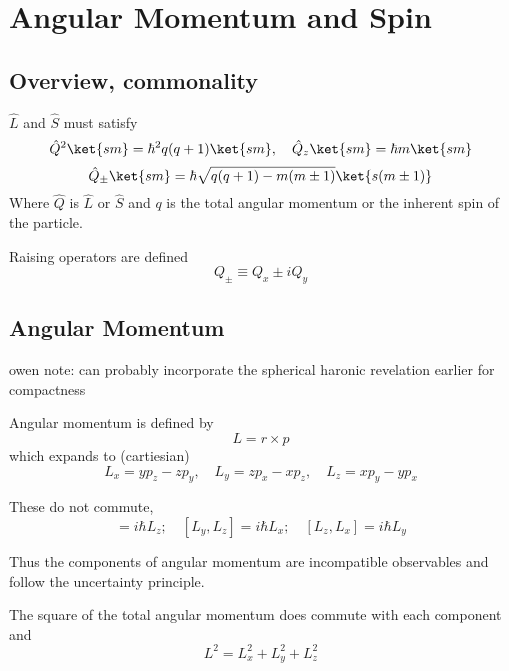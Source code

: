 \section{Angular Momentum and Spin}
\subsection{Overview, commonality}

$ \hat{L} $ and $ \hat{S} $ must satisfy
\begin{equation}
 \hat{Q}^2 \ket{sm}=\hbar^2 q(q+1)\ket{sm},\quad \hat{Q}_{z}\ket{sm}=\hbar m \ket{sm}
\end{equation}
\begin{equation}
  \hat{Q}_{\pm}\ket{sm}=\hbar\sqrt{q(q+1)-m(m\pm 1)}\ket{s(m\pm 1)}
\end{equation}
Where $ \hat{Q} $ is $ \hat{L}\text{ or }\hat{S} $ and $ q $ is the total angular momentum or the inherent spin of the particle.

Raising operators are defined 
\begin{equation}
  Q_{\pm}\equiv Q_{x}\pm iQ_{y}
\end{equation}


\subsection{Angular Momentum}
owen note: can probably incorporate the spherical haronic revelation earlier for compactness


Angular momentum is defined by
\begin{equation}
  L=r \times p
\end{equation}
which expands to (cartiesian)
\begin{equation}
  L_{x}=yp_{z}-zp_{y},\quad L_{y}=zp_{x}-xp_{z},\quad L_{z}=xp_{y}-yp_{x}
\end{equation}

These do not commute,
\begin{equation}
  [L_{x},L_{y}]=i \hbar L_{z};\quad [L_{y},L_{z}]=i \hbar L_{x};\quad [L_{z},L_{x}]=i \hbar L_{y}
\end{equation}

Thus the components of angular momentum are incompatible observables and follow the uncertainty principle.

The square of the total angular momentum does commute with each component and 
\begin{equation}
  L^2=L_{x}^2+L_{y}^2+L_{z}^2
\end{equation}

